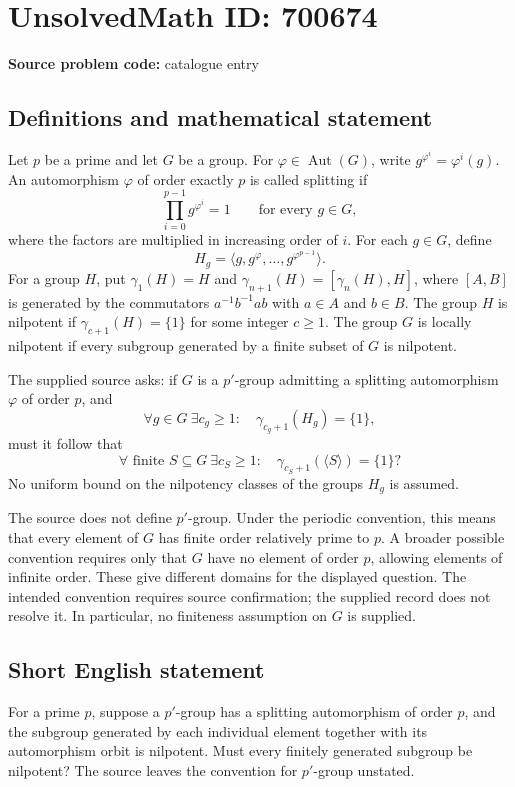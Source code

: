 \documentclass[11pt]{article}
\begin{document}
\section*{UnsolvedMath ID: 700674}
\textbf{Source problem code:} catalogue entry
\subsection{Definitions and mathematical statement}
Let \(p\) be a prime and let \(G\) be a group. For \(\varphi\in\operatorname{Aut}(G)\), write \(g^{\varphi^i}=\varphi^i(g)\). An automorphism \(\varphi\) of order exactly \(p\) is called splitting if
\[
\prod_{i=0}^{p-1}g^{\varphi^i}=1\qquad\text{for every }g\in G,
\]
where the factors are multiplied in increasing order of \(i\). For each \(g\in G\), define
\[
H_g=\langle g,g^\varphi,\ldots,g^{\varphi^{p-1}}\rangle.
\]
For a group \(H\), put \(\gamma_1(H)=H\) and \(\gamma_{n+1}(H)=[\gamma_n(H),H]\), where \([A,B]\) is generated by the commutators \(a^{-1}b^{-1}ab\) with \(a\in A\) and \(b\in B\). The group \(H\) is nilpotent if \(\gamma_{c+1}(H)=\{1\}\) for some integer \(c\geq1\). The group \(G\) is locally nilpotent if every subgroup generated by a finite subset of \(G\) is nilpotent.

The supplied source asks: if \(G\) is a \(p'\)-group admitting a splitting automorphism \(\varphi\) of order \(p\), and
\[
\forall g\in G\ \exists c_g\geq1:\quad \gamma_{c_g+1}(H_g)=\{1\},
\]
must it follow that
\[
\forall\text{ finite }S\subseteq G\ \exists c_S\geq1:\quad
\gamma_{c_S+1}(\langle S\rangle)=\{1\}?
\]
No uniform bound on the nilpotency classes of the groups \(H_g\) is assumed.

The source does not define \(p'\)-group. Under the periodic convention, this means that every element of \(G\) has finite order relatively prime to \(p\). A broader possible convention requires only that \(G\) have no element of order \(p\), allowing elements of infinite order. These give different domains for the displayed question. The intended convention requires source confirmation; the supplied record does not resolve it. In particular, no finiteness assumption on \(G\) is supplied.
\subsection{Short English statement}
For a prime \(p\), suppose a \(p'\)-group has a splitting automorphism of order \(p\), and the subgroup generated by each individual element together with its automorphism orbit is nilpotent. Must every finitely generated subgroup be nilpotent? The source leaves the convention for \(p'\)-group unstated.
\end{document}
